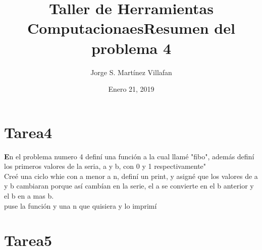 \documentclass[letterpaper, 12pt, oneside]{article}%
\title{\Huge Taller de Herramientas Computacionaes}
\author{Jorge S. Martínez Villafan}
\date{Enero 21, 2019}
\begin{document}
	\maketitle
	\newpage
	\title{Resumen del problema 4}
	\section{Tarea4}
	\textbf En el problema numero 4 definí una función a la cual llamé "fibo", además definí los primeros valores de la seria, a y b, con 0 y 1 respectivamente"\\
	Creé una ciclo whie con a menor a n,  definí un print, y asigné que los valores de a y b cambiaran porque así cambían en la serie, el a se convierte en el b anterior y el b en a mas b. \\
	puse la función y una n que quisiera y lo imprimí
	
	\section{Tarea5}
	
\end{document}
